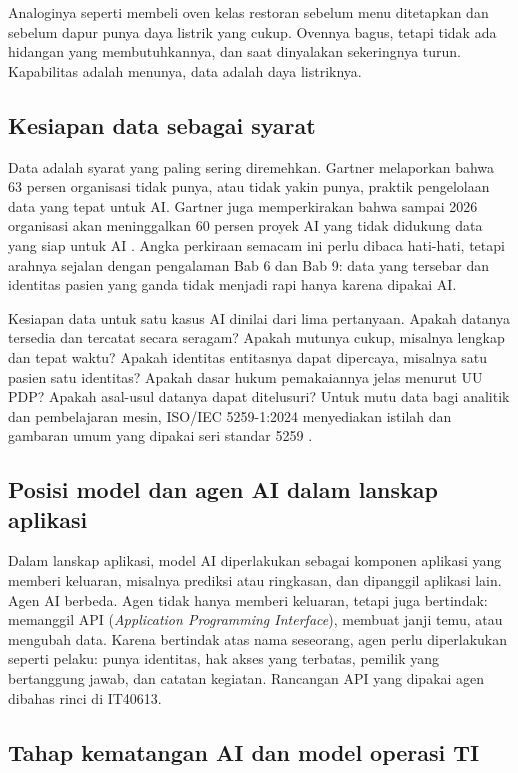 Analoginya seperti membeli oven kelas restoran sebelum menu ditetapkan dan
sebelum dapur punya daya listrik yang cukup. Ovennya bagus, tetapi tidak ada
hidangan yang membutuhkannya, dan saat dinyalakan sekeringnya turun.
Kapabilitas adalah menunya, data adalah daya listriknya.

\subsection*{Kesiapan data sebagai syarat}

Data adalah syarat yang paling sering diremehkan. Gartner melaporkan bahwa 63
persen organisasi tidak punya, atau tidak yakin punya, praktik pengelolaan
data yang tepat untuk AI. Gartner juga memperkirakan bahwa sampai 2026
organisasi akan meninggalkan 60 persen proyek AI yang tidak didukung data yang
siap untuk AI \cite{c10-gartner2025}. Angka perkiraan semacam ini perlu dibaca
hati-hati, tetapi arahnya sejalan dengan pengalaman Bab 6 dan Bab 9: data
yang tersebar dan identitas pasien yang ganda tidak menjadi rapi hanya karena
dipakai AI.

Kesiapan data untuk satu kasus AI dinilai dari lima pertanyaan. Apakah
datanya tersedia dan tercatat secara seragam? Apakah mutunya cukup, misalnya
lengkap dan tepat waktu? Apakah identitas entitasnya dapat dipercaya, misalnya
satu pasien satu identitas? Apakah dasar hukum pemakaiannya jelas menurut
UU PDP? Apakah asal-usul datanya dapat ditelusuri? Untuk mutu data bagi
analitik dan pembelajaran mesin, ISO/IEC 5259-1:2024 menyediakan istilah dan
gambaran umum yang dipakai seri standar 5259 \cite{c10-iso5259}.

\subsection*{Posisi model dan agen AI dalam lanskap aplikasi}

Dalam lanskap aplikasi, model AI diperlakukan sebagai komponen aplikasi yang
memberi keluaran, misalnya prediksi atau ringkasan, dan dipanggil aplikasi
lain. Agen AI berbeda. Agen tidak hanya memberi keluaran, tetapi juga
bertindak: memanggil API (\textit{Application Programming Interface}),
membuat janji temu, atau mengubah data. Karena bertindak atas nama seseorang,
agen perlu diperlakukan seperti pelaku: punya identitas, hak akses yang
terbatas, pemilik yang bertanggung jawab, dan catatan kegiatan. Rancangan API
yang dipakai agen dibahas rinci di IT40613.

\subsection*{Tahap kematangan AI dan model operasi TI}

